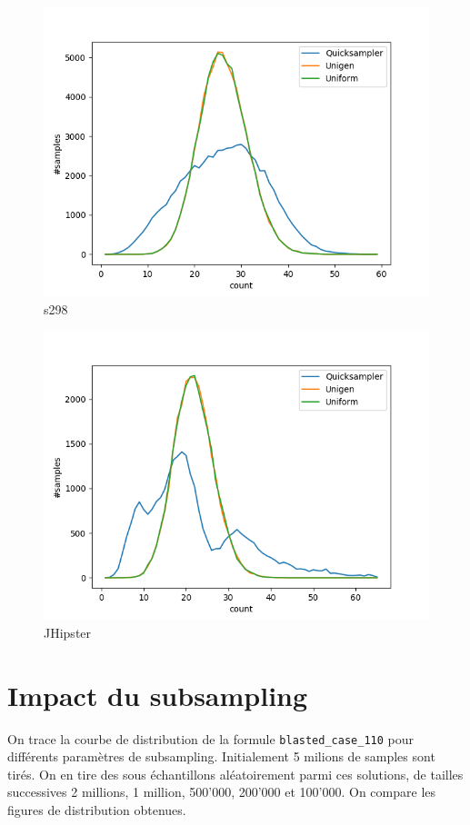 \documentclass{article}
\begin{document}
\begin{figure}[!h]
    \includegraphics[scale=0.7]{DistributionFigures/Figure_s298.png}
    \caption{s298}
\end{figure}
\begin{figure}[!h]
    \includegraphics[scale=0.7]{DistributionFigures/Figure_JHipster.png}
    \caption{JHipster}
\end{figure}

\clearpage

\section{Impact du subsampling}

On trace la courbe de distribution de la formule \texttt{blasted\_case\_110} pour différents paramètres de subsampling. Initialement 5 milions de samples sont tirés. On en tire des sous échantillons aléatoirement parmi ces solutions, de tailles successives 2 millions, 1 million, 500'000, 200'000 et 100'000. On compare les figures de distribution obtenues.
\end{document}
